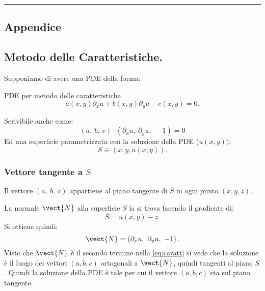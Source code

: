 \noindent\rule{0.48\textwidth}{0.7pt}
\newpage
\addtocounter{Sec}{\value{section}}%
\begin{appendices}
\section*{Appendice}%
\setcounter{section}{\theSec}%
\setcounter{subsection}{0}%
\renewcommand{\thesubsection}{\arabic{section}.\Alph{subsection}}

\subsection{Metodo delle Caratteristiche.}
\label{sub:caratteristiche}
Supponiamo di avere una PDE della forma:
\begin{redbox}{PDE per metodo delle caratteristiche}
\[
    a(x,y) \partial_{x}u + b(x,y) \partial_{y}u - c(x, y) = 0
.\] 
\end{redbox}
\noindent
Scrivibile anche come:
\begin{equation}
    \left(a,\ b,\ c\right)\cdot \left(\partial_{x}u,\ \partial_{y}u,\ -1\right) = 0
    \label{eq:caratt}
\end{equation}
Ed una superficie parametrizzata con la soluzione della PDE ($u(x,y))$: 
\[
    S \equiv (x,y, u(x,y) ) 
.\] 
%
\noindent
\subsubsection{Vettore tangente a $S$}%
\label{subsub:Vettore tangente a S}
\begin{bluebox}{}
Il vettore $\left(a, \ b, \ c\right)$ appartiene al piano tangente di $S$ in ogni punto $\left(x, y, z\right)$.
\end{bluebox}
\noindent
La normale $\vect{N}$ alla superficie $S$ la si trova facendo il gradiente di:
\[
    \overline{S} = u(x,y) - z
.\] 
Si ottiene quindi:
\[
    \vect{N}  = \left(\partial_{x}u, \ \partial_{y}u, \ -1\right)
.\] 
Visto che $\vect{N}$ è il secondo termine nella \ref{eq:caratt} si vede che la soluzione è il luogo dei vettori $(a, b,c)$ ortogonali a $\vect{N}$, quindi tangenti al piano $S$.
%
\noindent
Quindi la soluzione della PDE è tale per cui il vettore $(a,b,c)$ sta sul piano tangente.


\end{appendices}
